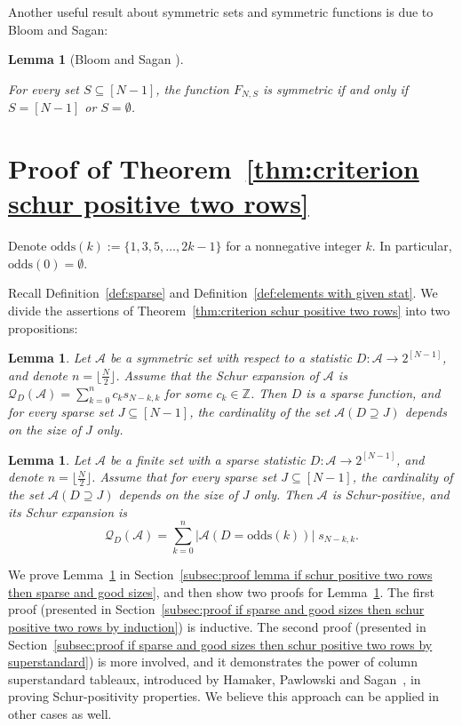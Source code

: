 \documentclass[11pt]{article}
\newtheorem{lemma}[theo]{Lemma}
\theoremstyle{definition}
\numberwithin{equation}{section}
\newcommand{\ZZ}{\mathbb{Z}}
\newcommand{\Q}{\mathcal{Q}}
\newcommand{\A}{\mathcal{A}}
\newcommand{\odds}{\mathrm{odds}}
\begin{document}
    

    

Another useful result about symmetric sets and symmetric functions is due to Bloom and Sagan:
\begin{lemma}[Bloom and Sagan {\cite[Lemma 2.2]{BloomSagan}}]
\label{lem:singleton not symmetric}
    
    For every set $S \subseteq [N-1]$, the function $F_{N,S}$ is symmetric if and only if $S=[N-1]$ or $S=\emptyset$.
\end{lemma}


\section{Proof of Theorem~\ref{thm:criterion schur positive two rows}}
\label{sec:criterion two rows}

Denote $\odds(k) := \{1,3,5,\dots, 2k-1\}$ for a nonnegative integer $k$. In particular, $\odds(0) = \emptyset$.

Recall Definition~\ref{def:sparse} and Definition~\ref{def:elements with given stat}. We divide the assertions of Theorem~\ref{thm:criterion schur positive two rows} into two propositions:
\begin{lemma}
\label{lem:if schur positive two rows then sparse and good sizes}
    Let $\A$ be a symmetric set with respect to a statistic $D:\A \to 2^{[N-1]}$, and denote $n = \lfloor\frac{N}{2} \rfloor$. Assume that the Schur expansion of $\A$ is $\Q_{D}(\A) = \sum_{k=0}^n c_k s_{N-k,k}$ for some $c_k \in \ZZ$. Then
    $D$ is a sparse function, and for every sparse set $J \subseteq [N-1]$, the cardinality of the set $\A(D \supseteq J)$ depends on the size of $J$ only.
\end{lemma}
\begin{lemma}
\label{lem:if sparse and good sizes then schur positive two rows}
    Let $\A$ be a finite set with a sparse statistic $D:\A \to 2^{[N-1]}$, and denote $n = \lfloor\frac{N}{2} \rfloor$. Assume that for every sparse set $J \subseteq [N-1]$, the cardinality of the set $\A(D \supseteq J)$ depends on the size of $J$ only.
    Then $\A$ is Schur-positive, and its Schur expansion is
    \[
        \Q_{D} (\A) = \sum_{k=0}^n |\A(D=\odds(k))|\; s_{N-k,k}.
    \]
\end{lemma}

We prove Lemma~\ref{lem:if schur positive two rows then sparse and good sizes} in Section~\ref{subsec:proof lemma if schur positive two rows then sparse and good sizes}, and then show two proofs for Lemma~\ref{lem:if sparse and good sizes then schur positive two rows}. The first proof (presented in Section~\ref{subsec:proof if sparse and good sizes then schur positive two rows by induction}) is inductive. The second proof (presented in Section~\ref{subsec:proof if sparse and good sizes then schur positive two rows by superstandard}) is more involved, and it demonstrates the power of column superstandard tableaux, introduced by Hamaker, Pawlowski and Sagan~\cite{S3_patterns_list}, in proving Schur-positivity properties. We believe this approach can be applied in other cases as well.
\end{document}
